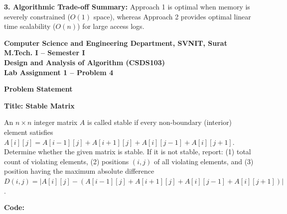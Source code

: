 \documentclass[12pt]{article}
\begin{document}
\textbf{3. Algorithmic Trade-off Summary:}
Approach 1 is optimal when memory is severely constrained ($O(1)$ space), whereas Approach 2 provides optimal linear time scalability ($O(n)$) for large access logs.

\newpage


\begin{center}
\textbf{Computer Science and Engineering Department, SVNIT, Surat}\\
\textbf{M.Tech. I -- Semester I}\\
\textbf{Design and Analysis of Algorithm (CSDS103)}\\
\textbf{Lab Assignment 1 -- Problem 4}
\end{center}

\vspace{0.4cm}

\textbf{Problem Statement}

\textbf{Title: Stable Matrix}

An $n \times n$ integer matrix $A$ is called stable if every non-boundary (interior) element satisfies $A[i][j] = A[i-1][j] + A[i+1][j] + A[i][j-1] + A[i][j+1]$. Determine whether the given matrix is stable. If it is not stable, report: (1) total count of violating elements, (2) positions $(i, j)$ of all violating elements, and (3) position having the maximum absolute difference $D(i, j) = |A[i][j] - (A[i-1][j] + A[i+1][j] + A[i][j-1] + A[i][j+1])|$.

\vspace{0.3cm}

\textbf{Code:}
\end{document}
